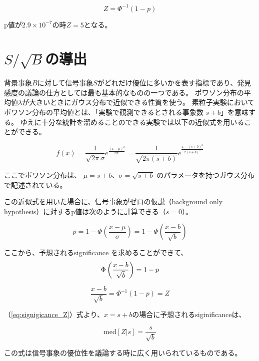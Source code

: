 \documentclass[uplatex]{jreport}
\begin{document}
\begin{equation}
  Z = \Phi^{-1}(1-p)
\end{equation}

p値が$2.9\times 10^{-7}$の時$Z=5$となる。

\section{$S/\sqrt{B}$の導出}
背景事象$B$に対して信号事象$S$がどれだけ優位に多いかを表す指標であり、発見感度の議論の仕方としては最も基本的なものの一つである。
ポワソン分布の平均値$\lambda$が大きいときにガウス分布で近似できる性質を使う。
素粒子実験においてポワソン分布の平均値とは、「実験で観測できるとされる事象数 $s+b$」を意味する。
ゆえに十分な統計を溜めることのできる実験では以下の近似式を用いることができる。

\begin{equation}
  f(x)
  = \frac{1}{\sqrt{2\pi}\sigma} e^{\frac{(x-\mu)^2}{2\sigma^2}}
  = \frac{1}{\sqrt{2\pi(s+b)}} e^{\frac{{x-(s+b)}^2}{2(s+b)^2}}
\end{equation}

ここでポワソン分布は、 $\mu = s+b$、$\sigma = \sqrt{s+b}$
のパラメータを持つガウス分布で記述されている。

この近似式を用いた場合に、信号事象がゼロの仮説（background only hypothesis）に対するp値は次のように計算できる（$s=0$）。

\begin{equation}
  p = 1 - \Phi \left(\frac{x-\mu}{\sigma} \right) = 1 - \Phi \left(\frac{x-b}{\sqrt{b}} \right)
\end{equation}

ここから、予想されるsignificance を求めることができて、
\begin{equation}
  \Phi \left(\frac{x-b}{\sqrt{b}} \right) = 1-p \\
\end{equation}

\begin{equation}\label{eq:signigicance_Z}
  \frac{x-b}{\sqrt{b}} = \Phi^{-1} (1-p) = Z
\end{equation}

（\ref{eq:signigicance_Z}）式より、$x=s+b$の場合に予想されるsiginificanceは、

\begin{equation}
  \mathrm{med}[Z|s] = \frac{s}{\sqrt{b}}
\end{equation}

この式は信号事象の優位性を議論する時に広く用いられているものである。
\end{document}
